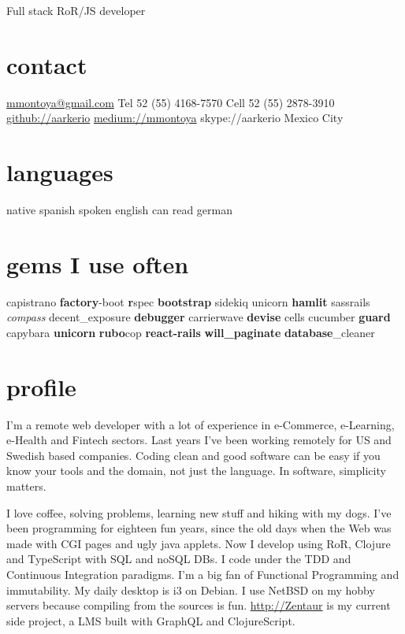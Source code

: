 \documentclass[]{k-cv}
\begin{document}
       {Full stack RoR/JS developer}

\begin{aside}
  \section{contact}
    \href{mailto:mmontoya@gmail.com}{mmontoya@gmail.com}
    Tel  52 (55) 4168-7570
    Cell 52 (55) 2878-3910
    \href{http://github.com/aarkerio}{github://aarkerio}
    \href{https://medium.com/@mmontoya}{medium://mmontoya}
    skype://aarkerio
    Mexico City
  \section{languages}
    native spanish
	  spoken english
	  can read german

  \section{gems I use often}
    capistrano \textbf{factory}-boot \textbf{r}spec
    \textbf{bootstrap} sidekiq unicorn \textbf{hamlit} sassrails \textit{compass}
    decent\_exposure \textbf{debugger} carrierwave \textbf{devise} cells
    cucumber \textbf{guard} capybara \textbf{unicorn}
    \textbf{rubo}cop \textbf{react-rails}
    \textbf{will\_paginate} \textbf{database}\_cleaner

\end{aside}

\section{profile}

I'm a remote web developer with a lot of experience in e-Commerce, e-Learning, e-Health and Fintech sectors.
Last years I've been working remotely for US and Swedish based companies. Coding clean and good software
can be easy if you know your tools and the domain, not just the language. In software, simplicity matters.

I love coffee, solving problems, learning new stuff and hiking with my dogs. I've been
programming for eighteen fun years, since the old days when the Web was made with CGI
pages and ugly java applets. Now I develop using RoR, Clojure and TypeScript with SQL and
noSQL DBs. I code under the TDD and Continuous Integration paradigms. I'm a big fan of
Functional Programming and immutability. My daily desktop is i3 on Debian. I use NetBSD
on my hobby servers because compiling from the sources is fun. \href{https://github.com/aarkerio/ZentaurLMS/blob/development/src/cljs/zentaur/events.cljs}{http://Zentaur}
is my current side project, a LMS built with GraphQL and ClojureScript.
\end{document}
